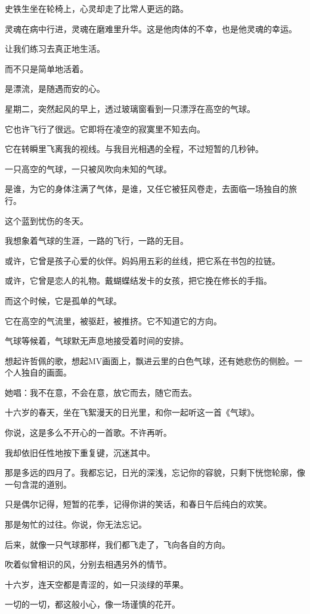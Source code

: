 		史铁生坐在轮椅上，心灵却走了比常人更远的路。\par
		灵魂在病中行进，灵魂在磨难里升华。这是他肉体的不幸，也是他灵魂的幸运。\par
		让我们练习去真正地生活。\par
		而不只是简单地活着。

	\endwriting



		是漂流，是随遇而安的心。

		\vspace{1em}
		星期二，突然起风的早上，透过玻璃窗看到一只漂浮在高空的气球。\par
		它也许飞行了很远。它即将在凌空的寂寞里不知去向。\par
		它在转瞬里飞离我的视线。与我目光相遇的全程，不过短暂的几秒钟。\par
		一只高空的气球，一只被风吹向未知的气球。\par
		是谁，为它的身体注满了气体，是谁，又任它被狂风卷走，去面临一场独自的旅行。\par
		这个蓝到忧伤的冬天。\par
		我想象着气球的生涯，一路的飞行，一路的无目。\par
		或许，它曾是孩子心爱的伙伴。妈妈用五彩的丝线，把它系在书包的拉链。\par
		或许，它曾是恋人的礼物。戴蝴蝶结发卡的女孩，把它挽在修长的手指。\par
		而这个时候，它是孤单的气球。\par
		它在高空的气流里，被驱赶，被推挤。它不知道它的方向。\par
		气球等候着，气球默无声息地接受着时间的安排。

		\vspace{1em}
		想起许哲佩的歌，想起MV画面上，飘进云里的白色气球，还有她悲伤的侧脸。一个人独自的画面。\par
		她唱：我不在意，不会在意，放它而去，随它而去。\par
		十六岁的春天，坐在飞絮漫天的日光里，和你一起听这一首《气球》。\par
		你说，这是多么不开心的一首歌。不许再听。\par
		我却依旧任性地按下重复键，沉迷其中。\par
		那是多远的四月了。我都忘记，日光的深浅，忘记你的容貌，只剩下恍惚轮廓，像一句含混的道别。\par
		只是偶尔记得，短暂的花季，记得你讲的笑话，和春日午后纯白的欢笑。\par
		那是匆忙的过往。你说，你无法忘记。\par
		后来，就像一只气球那样，我们都飞走了，飞向各自的方向。\par
		吹着似曾相识的风，分别去相遇另外的情节。\par
		十六岁，连天空都是青涩的，如一只淡绿的苹果。\par
		一切的一切，都这般小心，像一场谨慎的花开。

